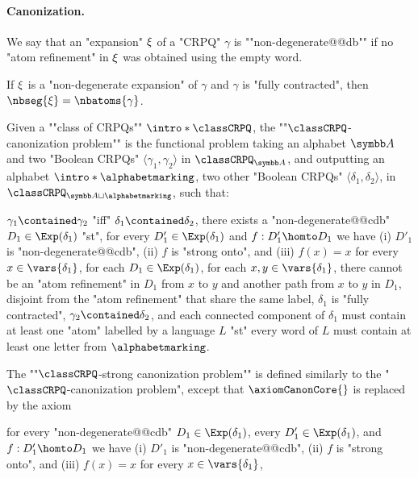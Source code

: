 \paragraph*{Canonization.}
We say that an "expansion" $\xi$ of a "CRPQ" $\gamma$ is \AP""non-degenerate@@db""
if no "atom refinement" in $\xi$ was obtained using the empty word.

\begin{fact}
	\AP\label{fact:nb-seg-expansion}
	If $\xi$ is a "non-degenerate expansion" of $\gamma$ and
	$\gamma$ is "fully contracted", then $\nbseg{\anexpansion} = \nbatoms{\gamma}$.%
\end{fact}

Given a \AP""class of CRPQs"" $\intro*\classCRPQ$, the \AP""$\classCRPQ$-canonization problem""
is the functional problem taking an alphabet $\A$
and two "Boolean CRPQs" $\langle \gamma_1,\gamma_2\rangle$ in $\classCRPQ_{\A}$,
and outputting an alphabet \AP$\intro*\alphabetmarking$, two other "Boolean CRPQs" $\langle \delta_1, \delta_2 \rangle$, in $\classCRPQ_{\A\sqcup \alphabetmarking}$,
such that:
\begin{description}
	\itemAP[\intro*\axiomCanonMonotonicity{}:] \axiomsCanon
		$\gamma_1 \contained \gamma_2$ "iff" $\delta_1 \contained \delta_2$,
	\itemAP[\intro*\axiomCanonCore{}:]
		there exists a "non-degenerate@@cdb" 
		$D_1 \in \Exp(\delta_1)$ "st", for every $D'_1 \in \Exp(\delta_1)$ and $f: D'_1 \homto D_1$ we have (i) $D'_1$ is "non-degenerate@@cdb", (ii) $f$ is "strong onto", and (iii)  $f(x)=x$ for every $x\in \vars{\delta_1}$,
	\itemAP[\intro*\axiomCanonNonRed{}:] for each $D_1 \in \Exp(\delta_1)$,
		for each $x,y \in \vars{\delta_1}$, there cannot be an "atom refinement" in $D_1$
		from $x$ to $y$ and another path from $x$ to $y$ in $D_1$, disjoint from the "atom refinement" that share the same label,
	\itemAP[\intro*\axiomCanonContracted{}:] $\delta_1$ is "fully contracted",
	\itemAP[\intro*\axiomCanonContainment{}:] $\gamma_2 \contained \delta_2$, and 
	\itemAP[\intro*\axiomCanonMarking{}:] each connected component of $\delta_1$ must contain at least one "atom"
	labelled by a language $L$ "st" every word of $L$ must contain at least one letter from $\alphabetmarking$.
\end{description}

The \AP""$\classCRPQ$-strong canonization problem"" is defined similarly to the "$\classCRPQ$-canonization problem", except that $\axiomCanonCore{}$ is replaced by the axiom
\begin{description}
	\itemAP[\intro*\axiomStrongCanonCore{}:] 
	for every "non-degenerate@@cdb" 
		$D_1 \in \Exp(\delta_1)$, every $D'_1 \in \Exp(\delta_1)$, and $f: D'_1 \homto D_1$ we have (i) $D'_1$ is "non-degenerate@@cdb", (ii) $f$ is "strong onto", and (iii)  $f(x)=x$ for every $x\in \vars{\delta_1}$,
\end{description}

